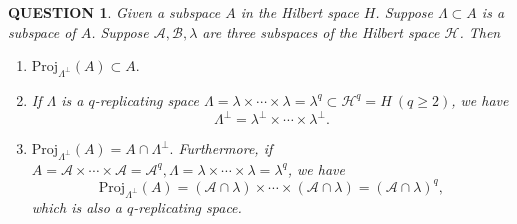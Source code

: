 \documentclass[12pt]{article}
\renewcommand{\b}{\mathscr{B}}
\renewcommand{\(}{\left(}%
\renewcommand{\)}{\right)}%
\renewcommand{\[}{\left[}%
\renewcommand{\]}{\right]}%
\renewcommand{\a}{\mathscr{A}}
\newtheorem{question}{QUESTION}[section]}
\begin{document}
  \begin{question}
  	Given a subspace $A$ in the Hilbert space $H$. Suppose $\Lambda\subset A$ is a subspace of $A$. Suppose $\mathscr{A},\b,\lambda$ are three subspaces of the Hilbert space $\mathscr{H}$. Then
  	\begin{enumerate}
  		\item $\mathrm{Proj}_{\Lambda^\perp }(A)\subset A.$
  		\item If $\Lambda$ is a $q$-replicating space $\Lambda=\lambda\times\cdots\times\lambda=\lambda ^q\subset \mathscr{H}^q=H\ (q\geq 2)$, we have 
  	\begin{equation*}
  		\Lambda^\perp=\lambda^\perp \times \cdots\times \lambda^\perp.
  	\end{equation*}
  		\item $\mathrm{Proj}_{\Lambda ^\perp }(A)= A\cap \Lambda^\perp.$ Furthermore, if $A=\mathscr{A}\times \cdots\times \mathscr{A}=\mathscr{A}^q,\Lambda=\lambda\times\cdots\times\lambda=\lambda ^q$, we have
  		\begin{equation*}
  			\mathrm{Proj}_{\Lambda ^\perp }(A)=(\a\cap\lambda)\times\cdots\times(\a\cap\lambda)=(\a\cap\lambda)^q,
  		\end{equation*}
  		which is also a $q$-replicating space.
  	\end{enumerate} 
  	
  \end{question}
\end{document}

